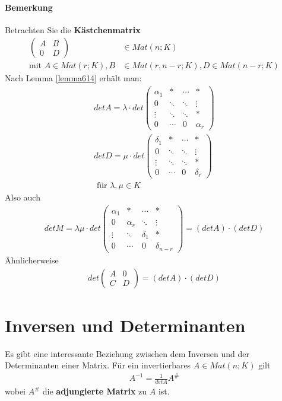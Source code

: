 \documentclass[11pt]{report}
\newcommand*\f[1] {\textbf{#1}}
\begin{document}
\paragraph{Bemerkung}
Betrachten Sie die \f{Kästchenmatrix}
\begin{align}
\begin{pmatrix} A & B \\ 0 & D\end{pmatrix} &\in Mat(n;K) \\
\text{mit } A \in Mat(r;K), B &\in Mat(r, n- r;K), D \in Mat(n-r; K)
\end{align}
Nach Lemma \ref{lemma614} erhält man:
\begin{align}
det A = \lambda \cdot det \begin{pmatrix} \alpha_1 & * & \cdots & * \\ 0 &\ddots & \ddots & \vdots \\ \vdots & \ddots & \ddots & * \\ 0 & \cdots & 0 & \alpha_r\end{pmatrix} \\
det D = \mu \cdot det \begin{pmatrix} \delta_1 & * & \cdots & * \\ 0 &\ddots & \ddots & \vdots \\ \vdots & \ddots & \ddots & * \\ 0 & \cdots & 0 & \delta_r\end{pmatrix} \\
\text{ für } \lambda, \mu \in K
\end{align}
Also auch
\begin{align}
det M = \lambda \mu \cdot det \begin{pmatrix} \alpha_1 & * & \cdots & * \\ 0 & \alpha_r & \ddots & \vdots \\ \vdots & \ddots & \delta_1 & * \\ 0 & \cdots & 0 & \delta_{n-r}\end{pmatrix} = (det A)\cdot (det D)
\end{align}
Ähnlicherweise 
\begin{align}
det\begin{pmatrix} A & 0 \\ C & D \end{pmatrix} = (det A)\cdot (det D)
\end{align}

\section{Inversen und Determinanten}
Es gibt eine interessante Beziehung zwischen dem Inversen und der Determinanten einer Matrix. Für ein invertierbares $A \in Mat(n;K)$ gilt 
\begin{align}
A^{-1} = \frac{1}{det A} A^{\#}
\end{align}
wobei $A^{\#}$ die \f{adjungierte Matrix} zu $A$ ist.
\end{document}
